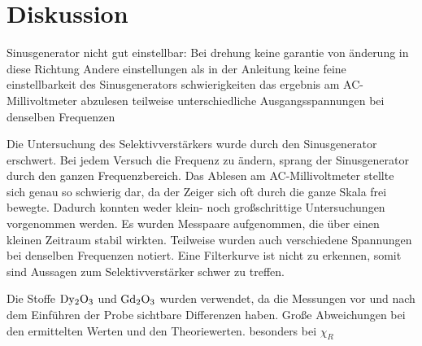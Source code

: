 \section{Diskussion}
\label{sec:Diskussion}
Sinusgenerator nicht gut einstellbar: Bei drehung keine garantie von änderung in diese Richtung
Andere einstellungen als in der Anleitung
keine feine einstellbarkeit des Sinusgenerators
schwierigkeiten das ergebnis am AC-Millivoltmeter abzulesen
teilweise unterschiedliche Ausgangsspannungen bei denselben Frequenzen

Die Untersuchung des Selektivverstärkers wurde durch den Sinusgenerator erschwert.
Bei jedem Versuch die Frequenz zu ändern, sprang der Sinusgenerator durch den ganzen Frequenzbereich.
Das Ablesen am AC-Millivoltmeter stellte sich genau so schwierig dar, da der Zeiger sich oft durch die ganze Skala frei bewegte.
Dadurch konnten weder klein- noch großschrittige Untersuchungen vorgenommen werden.
Es wurden Messpaare aufgenommen, die über einen kleinen Zeitraum stabil wirkten.
Teilweise wurden auch verschiedene Spannungen bei denselben Frequenzen notiert.
Eine Filterkurve ist nicht zu erkennen, somit sind Aussagen zum Selektivverstärker schwer zu treffen.

Die Stoffe $\ce{Dy2O3}$ und $\ce{Gd2O3}$ wurden verwendet, da die Messungen vor und nach dem Einführen der Probe sichtbare Differenzen haben.
Große Abweichungen bei den ermittelten Werten und den Theoriewerten. besonders bei $\chi_R$

